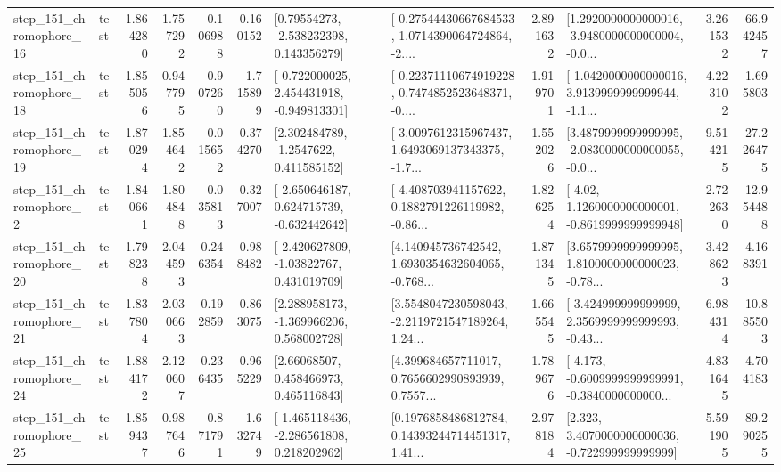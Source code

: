 \begin{tabular}{llrrrrllrlrr}
  step\_151\_chromophore\_16 &      test &      1.864280 &    1.757292 &     -0.106988 &  0.160152 &     [0.79554273, -2.538232398, 0.143356279] &  [-0.27544430667684533, 1.0714390064724864, -2.... &       2.891632 &  [1.2920000000000016, -3.9480000000000004, -0.0... &            3.261532 &         66.942457 \\
  step\_151\_chromophore\_18 &      test &      1.855056 &    0.947795 &     -0.907260 & -1.715899 &   [-0.722000025, 2.454431918, -0.949813301] &  [-0.22371110674919228, 0.7474852523648371, -0.... &       1.919701 &  [-1.0420000000000016, 3.9139999999999944, -1.1... &            4.223102 &          1.695803 \\
  step\_151\_chromophore\_19 &      test &      1.870294 &    1.854642 &     -0.015652 &  0.374270 &      [2.302484789, -1.2547622, 0.411585152] &  [-3.0097612315967437, 1.6493069137343375, -1.7... &       1.552026 &  [3.4879999999999995, -2.0830000000000055, -0.0... &            9.514215 &         27.226475 \\
   step\_151\_chromophore\_2 &      test &      1.840661 &    1.804848 &     -0.035813 &  0.327007 &   [-2.650646187, 0.624715739, -0.632442642] &  [-4.408703941157622, 0.1882791226119982, -0.86... &       1.826254 &   [-4.02, 1.1260000000000001, -0.8619999999999948] &            2.722630 &         12.954488 \\
  step\_151\_chromophore\_20 &      test &      1.798238 &    2.044593 &      0.246354 &  0.988482 &    [-2.420627809, -1.03822767, 0.431019709] &  [4.140945736742542, 1.6930354632604065, -0.768... &       1.871345 &  [3.6579999999999995, 1.8100000000000023, -0.78... &            3.428623 &          4.168391 \\
  step\_151\_chromophore\_21 &      test &      1.837804 &    2.030663 &      0.192859 &  0.863075 &    [2.288958173, -1.369966206, 0.568002728] &  [3.5548047230598043, -2.2119721547189264, 1.24... &       1.665545 &  [-3.424999999999999, 2.3569999999999993, -0.43... &            6.984314 &         10.885503 \\
  step\_151\_chromophore\_24 &      test &      1.884172 &    2.120607 &      0.236435 &  0.965229 &      [2.66068507, 0.458466973, 0.465116843] &  [4.399684657711017, 0.7656602990893939, 0.7557... &       1.789676 &  [-4.173, -0.6009999999999991, -0.3840000000000... &            4.831645 &          4.704183 \\
  step\_151\_chromophore\_25 &      test &      1.859437 &    0.987646 &     -0.871791 & -1.632749 &   [-1.465118436, -2.286561808, 0.218202962] &  [0.1976858486812784, 0.14393244714451317, 1.41... &       2.978184 &    [2.323, 3.4070000000000036, -0.722999999999999] &            5.591905 &         89.290255 \\

\end{tabular}

